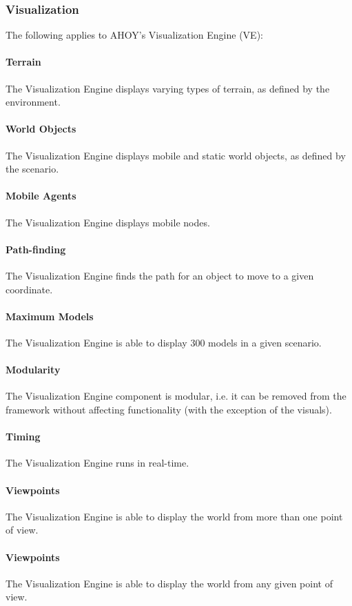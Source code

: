 \documentclass[titlepage]{article}
\begin{document}
\subsubsection{Visualization}
The following applies to AHOY's Visualization Engine (VE):
    \paragraph{Terrain} The Visualization Engine displays varying types of terrain, as defined by the environment.
    \paragraph{World Objects} The Visualization Engine displays mobile and static world objects, as defined by the scenario.
    \paragraph{Mobile Agents} The Visualization Engine displays mobile nodes.
    \paragraph{Path-finding} The Visualization Engine finds the path for an object to move to a given coordinate.
    \paragraph{Maximum Models} The Visualization Engine is able to display 300 models in a given scenario.
    \paragraph{Modularity} The Visualization Engine component is modular, i.e. it can be removed from the framework without affecting functionality (with the exception of the visuals).
    \paragraph{Timing} The Visualization Engine runs in real-time.
    \paragraph{Viewpoints} The Visualization Engine is able to display the world from more than one point of view.
    \paragraph{Viewpoints} The Visualization Engine is able to display the world from any given point of view.
\end{document}
